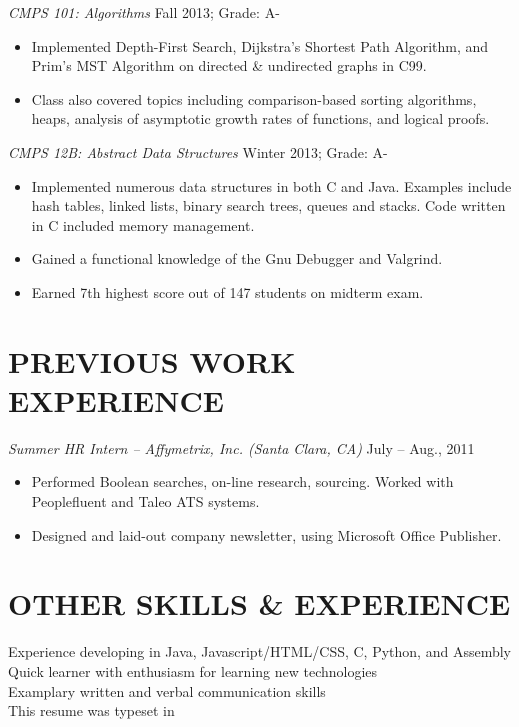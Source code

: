 \documentclass[margin]{res}
\begin{document}
\begin{resume}
                {\sl CMPS 101: Algorithms} \hfill Fall 2013; Grade: A- \\
                \begin{itemize}  \itemsep -2pt %
		        \item Implemented Depth-First Search, Dijkstra’s Shortest Path Algorithm, and Prim’s MST Algorithm on
			directed \& undirected graphs in C99.
			\item Class also covered topics including comparison-based sorting algorithms, heaps, analysis of
			asymptotic growth rates of functions, and logical proofs. 
                \end{itemize} 

                {\sl CMPS 12B: Abstract Data Structures} \hfill Winter 2013; Grade: A- \\
                \begin{itemize} \itemsep -2pt
                	\item Implemented numerous data structures in both C and Java. Examples include hash tables, linked
			lists, binary search trees, queues and stacks. Code written in C included memory management.
			\item Gained a functional knowledge of the Gnu Debugger and Valgrind.
			\item Earned 7th highest score out of 147 students on midterm exam. 
                \end{itemize} 
\section{PREVIOUS WORK EXPERIENCE}
                {\sl Summer HR Intern – Affymetrix, Inc. (Santa Clara, CA)} \hfill July – Aug., 2011 \\
			\begin{itemize} \itemsep -2pt
			\item Performed Boolean searches, on-line research, sourcing. Worked with Peoplefluent and Taleo
			ATS systems.
			\item Designed and laid-out company newsletter, using Microsoft Office Publisher.
			\end{itemize}
\section{OTHER SKILLS \& EXPERIENCE}
		Experience developing in Java, Javascript\slash HTML\slash CSS, C, Python, and Assembly\\
		Quick learner with enthusiasm for learning new technologies\\
		Examplary written and verbal communication skills\\
		This resume was typeset in \LaTeXe

\end{resume}
\end{document}
